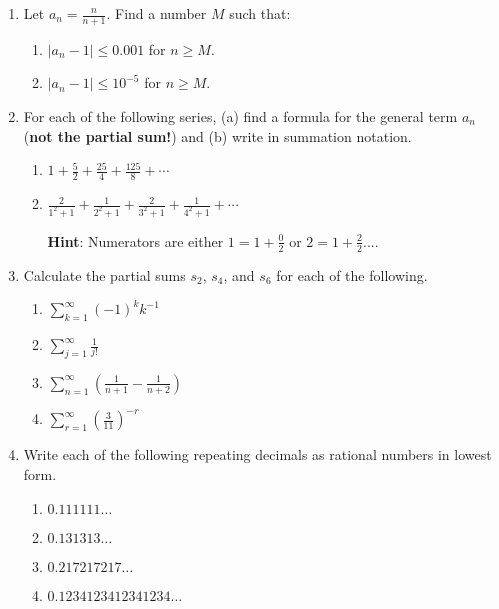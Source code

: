 \documentclass[12 pt]{article}
\newcommand{\hint}[1]{\hspace{0.5in}\textbf{Hint}: #1}
\begin{document}
\begin{enumerate}[leftmargin=0in, rightmargin=-0.25in]
	\item Let $a_n=\frac{n}{n+1}$. Find a number $M$ such that:
	\begin{enumerate}
		\item $|a_n-1|\leq0.001$ for $n\geq M$.
		\item $|a_n-1|\leq 10^{-5}$ for $n\geq M$.
	\end{enumerate}
	\item For each of the following series, (a) find a formula for the general term $a_n$ (\textbf{not the partial sum!}) and (b) write in summation notation.
	\begin{enumerate}
		\item $1+\frac{5}{2}+\frac{25}{4}+\frac{125}{8}+\cdots$
		\item $\frac{2}{1^2+1}+\frac{1}{2^2+1}+\frac{2}{3^2+1}+\frac{1}{4^2+1}+\cdots$
		
		\hfill\hint{Numerators are either $1=1+\frac{0}{2}$ or $2=1+\frac{2}{2}$....}
	\end{enumerate}

	\newpage
	
	\item Calculate the partial sums $s_2$, $s_4$, and $s_6$ for each of the following.
	\begin{multicols}{2}
		\begin{enumerate}
			\item $\sum_{k=1}^\infty (-1)^k k^{-1}$
			\item $\sum_{j=1}^\infty \frac{1}{j!}$
			\item $\sum_{n=1}^\infty\left(\frac{1}{n+1}-\frac{1}{n+2}\right)$
			\item $\sum_{r=1}^\infty\left(\frac{3}{11}\right)^{-r}$
		\end{enumerate}
	\end{multicols}

	\item Write each of the following repeating decimals as rational numbers in lowest form.
	\begin{multicols}{2}
		\begin{enumerate}
			\item $0.111111\ldots$
			\item $0.131313\ldots$
			\item $0.217217217\ldots$
			\item $0.1234123412341234\ldots$
		\end{enumerate}
	\end{multicols}


\end{enumerate}
\end{document}
